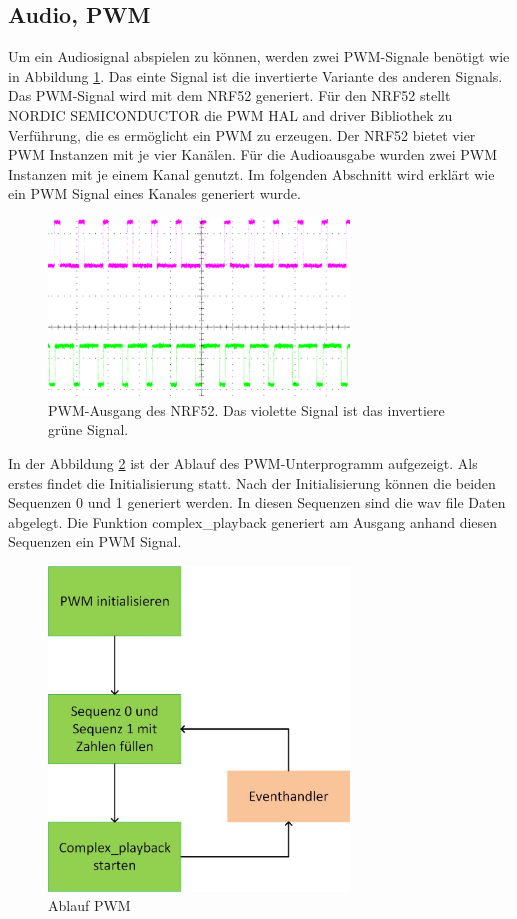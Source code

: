 \subsection{Audio, PWM}\label{sec:audioPWM}
Um ein Audiosignal abspielen zu können, werden zwei PWM-Signale benötigt wie in Abbildung \ref{fig:pwm_ausgang}. Das einte Signal ist die invertierte Variante des anderen Signals. 
Das PWM-Signal wird mit dem NRF52 generiert. Für den NRF52 stellt NORDIC SEMICONDUCTOR die PWM HAL and driver Bibliothek zu Verführung, die es ermöglicht ein PWM zu erzeugen. Der NRF52 bietet vier PWM Instanzen mit je vier Kanälen. Für die Audioausgabe wurden zwei PWM Instanzen mit je einem Kanal genutzt. Im folgenden Abschnitt wird erklärt wie ein PWM Signal eines Kanales generiert wurde.

\begin{figure}[H]
	\begin{center}
		\includegraphics[width=80mm]{data/PWM_Signal_500Hz_Mono}
		\caption[PWM-Ausgang des NRF52]{PWM-Ausgang des NRF52. Das violette Signal ist das invertiere grüne Signal.} %
		\label{fig:pwm_ausgang}
	\end{center}
\end{figure}

In der Abbildung \ref{fig:pwm_ablauf} ist der Ablauf des PWM-Unterprogramm aufgezeigt. Als erstes findet die Initialisierung statt. Nach der Initialisierung können die beiden Sequenzen 0 und 1 generiert werden. In diesen Sequenzen sind die wav file Daten abgelegt. Die Funktion complex\_playback generiert am Ausgang anhand diesen Sequenzen ein PWM Signal.

\begin{figure}[H]
	\begin{center}
		\includegraphics[width=80mm]{data/pwm_ablauf.jpg}
		\caption[Ablauf PWM]{Ablauf PWM} %
		\label{fig:pwm_ablauf}
	\end{center}
\end{figure}

